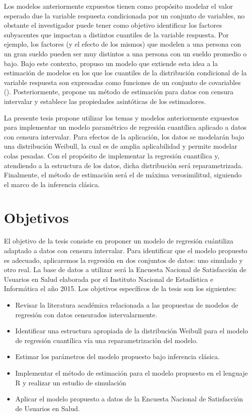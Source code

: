 Los modelos anteriormente expuestos tienen como propósito modelar el valor esperado due la variable respuesta condicionada por un conjunto de variables, no obstante el investigador puede tener como objetivo identificar los factores subyacentes que impactan a distintos cuantiles de la variable respuesta. Por ejemplo, los factores (y el efecto de los mismos) que modelen a una persona con un gran sueldo pueden ser muy distintos a una persona con un sueldo promedio o bajo. Bajo este contexto, \cite{koenker:kk} propuso un modelo que extiende esta idea a la estimación de modelos en los que los cuantiles de la distribución condicional de la variable respuesta son expresadas como funciones de un conjunto de covariables (\cite{koenker:2001}). Posteriormente, \cite{zhou:x} propone un método de estimación para datos con censura intervalar y establece las propiedades asintóticas de los estimadores.

La presente tesis propone utilizar los temas y modelos anteriormente expuestos para implementar un modelo paramétrico de regresión cuantílica aplicado a datos con censura intervalar. Para efectos de la aplicación, los datos se modelarán bajo una distribución Weibull, la cual es de amplia aplicabilidad y permite modelar colas pesadas. Con el propósito de implementar la regresión cuantílica y, atendiendo a la estructura de los datos, dicha distribución será reparametrizada. Finalmente, el método de estimación será el de máxima verosimilitud, siguiendo el marco de la inferencia clásica.

\section{Objetivos}
El objetivo de la tesis consiste en proponer un modelo de regresión cuántiliza adaptado a datos con censura intervalar. Para identificar que el modelo propuesto es adecuado, aplicaremos la regresión en dos conjuntos de datos: uno simulado y otro real. La base de datos a utilizar será la Encuesta Nacional de Satisfacción de Usuarios en Salud elaborada por el Instituto Nacional de Estadística e Informática el año 2015. Los objetivos específicos de la tesis son los siguientes:
\begin{itemize}
	\item Revisar la literatura académica relacionada a las propuestas de modelos de regresión con datos censurados intervalarmente.
	\item Identificar una estructura apropiada de la distribución Weibull para el modelo de regresión cuantílica vía una reparametrización del modelo.
	\item Estimar los parámetros del modelo propuesto bajo inferencia clásica.
	\item Implementar el método de estimación para el modelo propuesto en el lenguaje R y realizar un estudio de simulación
	\item Aplicar el modelo propuesto a datos de la Encuesta Nacional de Satisfacción de Usuarios en Salud.
\end{itemize}

